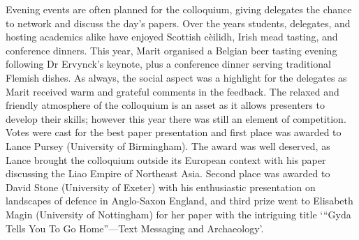\documentclass[%
	]{ijsra}
\begin{document}
Evening events are often planned for the colloquium, giving delegates the chance to network and discuss the day’s papers. Over the years students, delegates, and hosting academics alike have enjoyed Scottish cèilidh, Irish mead tasting, and conference dinners. This year, Marit organised a Belgian beer tasting evening following Dr Ervynck’s keynote, plus a conference dinner serving traditional Flemish dishes. As always, the social aspect was a highlight for the delegates as Marit received warm and grateful comments in the feedback.
The relaxed and friendly atmosphere of the colloquium is an asset as it allows presenters to develop their skills; however this year there was still an element of competition. Votes were cast for the best paper presentation and first place was awarded to Lance Pursey (University of Birmingham). The award was well deserved, as Lance brought the colloquium outside its European context with his paper discussing the Liao Empire of Northeast Asia. Second place was awarded to David Stone (University of Exeter) with his enthusiastic presentation on landscapes of defence in Anglo-Saxon England, and third prize went to Elisabeth Magin (University of Nottingham) for her paper with the intriguing title ‘“Gyda Tells You To Go Home”—Text Messaging and Archaeology'. 
\end{document}
